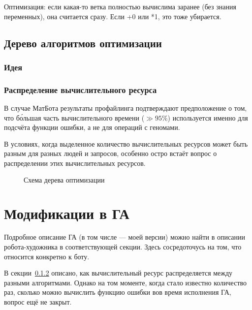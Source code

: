 \documentclass[11pt]{article}
\begin{document}
    Оптимизация: если какая-то ветка полностью вычислима заранее (без знания переменных), она считается сразу.
    Если +0 или *1, это тоже убирается.


    \subsection{Дерево алгоритмов оптимизации}\label{subsec:opt-algo-tree}

    \subsubsection{Идея}

    \subsubsection{Распределение вычислительного ресурса}\label{subsubsec:resource-distribution}

    В случае МатБота результаты профайлинга подтверждают предположение о том, что бо́льшая часть вычислительного времени ($\gg 95\%$)
    используется именно для подсчёта функции ошибки, а не для операций с геномами.

    В условиях, когда выделенное количество вычислительных ресурсов может быть разным для разных людей и запросов,
    особенно остро встаёт вопрос о распределении этих вычислительных ресурсов.


    \begin{figure}[h]
        \centering
        \caption{Схема дерева оптимизации}
        \label{fig:opt-tree}
    \end{figure}
    \FloatBarrier


    \section{Модификации в ГА}\label{sec:ga-modifications}
    Подробное описание ГА (в том числе — моей версии) можно найти в описании робота-художника в соответствующей секции.
    Здесь сосредоточусь на том, что относится конкретно к боту.

    В секции~\ref{subsubsec:resource-distribution} описано, как вычислительный ресурс распределяется между разными алгоритмами.
    Однако на том моменте, когда стало известно количество раз, сколько можно вычислить функцию ошибки вов время исполнения ГА,
    вопрос ещё не закрыт.
\end{document}
